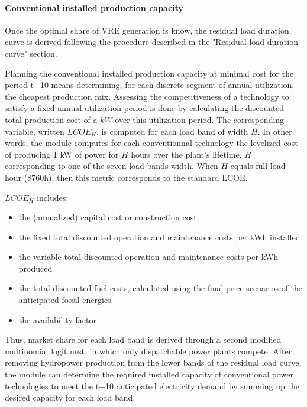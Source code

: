 {\paragraph{Conventional installed production capacity}

Once the optimal share of VRE generation is know, the residual load duration curve is derived following the procedure described in the "Residual load duration curve" section. 



Planning the conventional installed production capacity at minimal cost for the period t+10 means determining, for each discrete segment of annual utilization, the cheapest production mix.
Assessing the competitiveness of a technology to satisfy a fixed annual utilization period is done by calculating the discounted total production cost of a 
$kW$ over this utilization period.
 The corresponding variable, written $LCOE_{H}$, is computed for each load band of width $H$. In other words, the module computes for each conventionnal technology the levelized cost of producing 1 kW of power for $H$ hours over the plant's lifetime, $H$ corresponding to one of the seven load bands width. When $H$ equals full load hour (8760h), then this metric corresponds to the standard LCOE. 

$LCOE_{H}$ includes:

\begin{itemize}
    \item the (annualized) capital cost or construction cost
    \item the fixed total discounted operation and maintenance costs per kWh installed
    \item the variable total discounted operation and maintenance costs per kWh produced
    \item the total discounted fuel costs, calculated using the final price scenarios of the anticipated fossil energies.
    \item  the availability factor
    
\end{itemize}



Thus, market share for each load band is derived through a second modified multinomial logit nest, in which only dispatchable power plants compete. After removing hydropower production from the  lower bands of the residual load curve, the module can determine the required installed capacity of conventional power technologies to meet the t+10 anticipated electricity demand by summing up the desired capacity for each load band.

}
